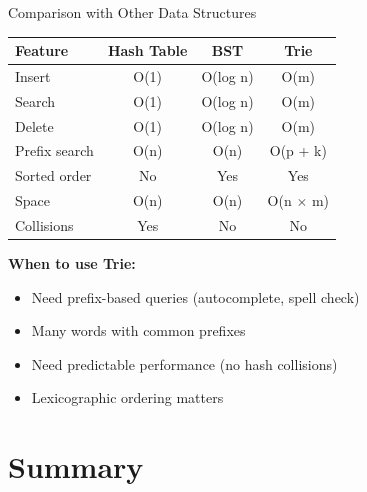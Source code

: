 \documentclass[aspectratio=169]{beamer}
\begin{document}
\begin{frame}{Comparison with Other Data Structures}
  \begin{table}
    \centering
    \small
    \begin{tabular}{|l|c|c|c|}
      \hline
      \textbf{Feature} & \textbf{Hash Table} & \textbf{BST} & \textbf{Trie} \\
      \hline
      Insert & O(1) & O(log n) & O(m) \\
      \hline
      Search & O(1) & O(log n) & O(m) \\
      \hline
      Delete & O(1) & O(log n) & O(m) \\
      \hline
      Prefix search & O(n) & O(n) & O(p + k) \\
      \hline
      Sorted order & No & Yes & Yes \\
      \hline
      Space & O(n) & O(n) & O(n $\times$ m) \\
      \hline
      Collisions & Yes & No & No \\
      \hline
    \end{tabular}
  \end{table}

  \vspace{0.3cm}
  \textbf{When to use Trie:}
  \begin{itemize}
    \item Need prefix-based queries (autocomplete, spell check)
    \item Many words with common prefixes
    \item Need predictable performance (no hash collisions)
    \item Lexicographic ordering matters
  \end{itemize}
\end{frame}

\section{Summary}
\end{document}
